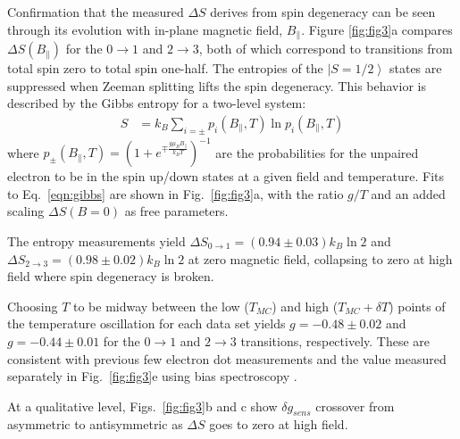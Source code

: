\documentclass[twocolumn,showpacs,amsmath,amssymb,prl,aps,superscriptaddress]{revtex4-1}
\newcommand{\ket}[1]{\ensuremath{\left|#1\right\rangle}}
\begin{document}
Confirmation that the measured $\Delta S$ derives from spin degeneracy can be seen through its evolution with in-plane magnetic field, $B_\parallel$. Figure \ref{fig:fig3}a compares $\Delta S(B_\parallel)$ for the $0 \rightarrow1 $ and $2 \rightarrow 3$, both of which correspond to transitions from total spin zero to total spin one-half. The entropies of the $\ket{S=1/2}$ states are suppressed when Zeeman splitting lifts the spin degeneracy. This behavior is described by the Gibbs entropy for a two-level system:
%
\begin{align}
\label{eqn:gibbs}
        S &= k_B \sum_{i=\pm} p_{i}(B_\parallel, T) \ln{ p_{i}(B_\parallel,T) }
\end{align}
%
where $p_{\pm}(B_\parallel, T) = (1+ e^{\mp \frac{g\mu_B B_{\parallel}}{k_B T}})^{-1}$ are the probabilities for the unpaired electron to be in the spin up/down states at a given field and temperature. Fits to Eq.~\ref{eqn:gibbs} are shown in Fig.~\ref{fig:fig3}a, with the ratio $g/T$ and an added scaling $\Delta S(B=0)$ as free parameters.

The entropy measurements yield $\Delta S_{0 \rightarrow 1}=(0.94 \pm 0.03) k_B \ln{2}$ and $\Delta S_{2 \rightarrow 3}=(0.98 \pm 0.02) k_B \ln{2}$ at zero magnetic field, collapsing to zero at high field where spin degeneracy is broken.  

Choosing $T$ to be midway between the low ($T_{MC}$) and high ($T_{MC}+\delta T$) points of the temperature oscillation for each data set yields $g=-0.48 \pm 0.02$ and $g=-0.44 \pm 0.01 $ for the $0\rightarrow 1$ and $2\rightarrow 3$ transitions, respectively. These are consistent with previous few electron dot measurements and the value measured separately in Fig.~\ref{fig:fig3}e using bias spectroscopy \cite{Cronenwett1998,Hanson2003,Zumbuhl2004}.

At a qualitative level, Figs.~\ref{fig:fig3}b and c show $\delta g_{sens}$ crossover from asymmetric to antisymmetric as $\Delta S$ goes to zero at high field.
\end{document}
